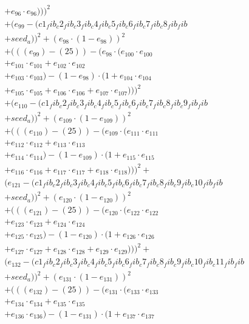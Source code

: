 \documentclass[10pt, a4paper]{article}
\begin{document}
\begin{align*}
& + e_{96} \cdot e_{96})))^{2} \\
& + (e_{99} - (c1_fib_c2_fib_c3_fib_c4_fib_c5_fib_c6_fib_c7_fib_c8_fib_fib \\
& + seed_a))^{2} + (e_{98} \cdot (1 - e_{98}))^{2} \\
& + (((e_{99}) - (25)) - (e_{98} \cdot (e_{100} \cdot e_{100} \\
& + e_{101} \cdot e_{101} + e_{102} \cdot e_{102} \\
& + e_{103} \cdot e_{103}) - (1 - e_{98}) \cdot (1 + e_{104} \cdot e_{104} \\
& + e_{105} \cdot e_{105} + e_{106} \cdot e_{106} + e_{107} \cdot e_{107})))^{2} \\
& + (e_{110} - (c1_fib_c2_fib_c3_fib_c4_fib_c5_fib_c6_fib_c7_fib_c8_fib_c9_fib_fib \\
& + seed_a))^{2} + (e_{109} \cdot (1 - e_{109}))^{2} \\
& + (((e_{110}) - (25)) - (e_{109} \cdot (e_{111} \cdot e_{111} \\
& + e_{112} \cdot e_{112} + e_{113} \cdot e_{113} \\
& + e_{114} \cdot e_{114}) - (1 - e_{109}) \cdot (1 + e_{115} \cdot e_{115} \\
& + e_{116} \cdot e_{116} + e_{117} \cdot e_{117} + e_{118} \cdot e_{118})))^{2} + \\
& (e_{121} - (c1_fib_c2_fib_c3_fib_c4_fib_c5_fib_c6_fib_c7_fib_c8_fib_c9_fib_c10_fib_fib \\
& + seed_a))^{2} + (e_{120} \cdot (1 - e_{120}))^{2} \\
& + (((e_{121}) - (25)) - (e_{120} \cdot (e_{122} \cdot e_{122} \\
& + e_{123} \cdot e_{123} + e_{124} \cdot e_{124} \\
& + e_{125} \cdot e_{125}) - (1 - e_{120}) \cdot (1 + e_{126} \cdot e_{126} \\
& + e_{127} \cdot e_{127} + e_{128} \cdot e_{128} + e_{129} \cdot e_{129})))^{2} + \\
& (e_{132} - (c1_fib_c2_fib_c3_fib_c4_fib_c5_fib_c6_fib_c7_fib_c8_fib_c9_fib_c10_fib_c11_fib_fib \\
& + seed_a))^{2} + (e_{131} \cdot (1 - e_{131}))^{2} \\
& + (((e_{132}) - (25)) - (e_{131} \cdot (e_{133} \cdot e_{133} \\
& + e_{134} \cdot e_{134} + e_{135} \cdot e_{135} \\
& + e_{136} \cdot e_{136}) - (1 - e_{131}) \cdot (1 + e_{137} \cdot e_{137} \\

\end{align*}
\end{document}
